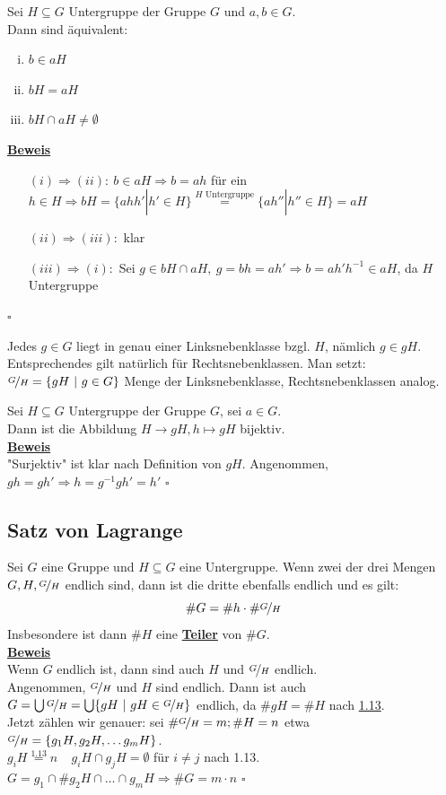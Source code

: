 \documentclass[a4paper, pagesize=pdftex, pdftex, twoside, headsepline, index=totoc,toc=listof, fontsize=10pt, cleardoublepage=empty, headinclude, DIV=13, BCOR=13mm]{scrartcl}
\newcommand{\bet}[1]{\uline{\textbf{#1}}} %
\newcommand{\Index}[1]{\uline{\textbf{#1}}\index{#1}} %
\begin{document}
Sei $H\subseteq G$ Untergruppe der Gruppe $G$ und $a,b\in G$.\\
Dann sind äquivalent:
\begin{enumerate}[(i)]
	\item $b\in aH$
	\item $bH=aH$
	\item $bH \cap aH \not= \emptyset$
\end{enumerate}
\bet{Beweis}\\
\begin{itemize}
	\item[$(i)\Rightarrow (ii):~b\in aH \Rightarrow b=ah$ für ein $h\in H \Rightarrow bH=\{ahh' | h' \in H\} \stackrel{H\text{ Untergruppe}}{=}\{ah'' | h''\in H\}=aH$]
	\item[$(ii) \Rightarrow (iii):$ klar]
	\item[$(iii) \Rightarrow (i):$ Sei $g \in bH \cap aH,~g=bh=ah' \Rightarrow b=ah'h^{-1} \in aH$, da $H$ Untergruppe]
\end{itemize}
\hfill $\square$

Jedes $g\in G$ liegt in genau einer Linksnebenklasse bzgl. $H$, nämlich $g \in gH$.
Entsprechendes gilt natürlich für Rechtsnebenklassen. Man setzt:\\
$\nicefrac{G}{H}=\{gH~|~g \in G \}$ Menge der Linksnebenklasse, Rechtsnebenklassen analog.

Sei $H\subseteq G$ Untergruppe der Gruppe $G$, sei $a \in G$.\\
Dann ist die Abbildung $H \to gH, h \mapsto gH$ bijektiv.\\
\bet{Beweis}\\
"Surjektiv" ist klar nach Definition von $gH$. Angenommen, $gh=gh' \Rightarrow h=g^{-1}gh'=h'$
\hfill $\square$

\subsection{Satz von Lagrange}
\label{sub:satz_von_lagrange}
Sei $G$ eine Gruppe und $H\subseteq G$ eine Untergruppe. Wenn zwei der drei Mengen $G,H,\nicefrac{G}{H}$ endlich sind, dann ist die dritte ebenfalls endlich und es gilt:\\
\[\#G=\#h \cdot \#\nicefrac{G}{H} \]
Insbesondere ist dann $\#H$ eine \Index{Teiler} von $\#G$.\\
\vfill
\bet{Beweis}\\
Wenn $G$ endlich ist, dann sind auch $H$ und $\nicefrac{G}{H}$ endlich.\\
Angenommen, $\nicefrac{G}{H}$ und $H$ sind endlich. Dann ist auch $G= \bigcup \nicefrac{G}{H}=\bigcup\{gH~|~gH\in \nicefrac{G}{H} \}$ endlich, da $\#gH=\#H$ nach \hyperref[sub:nebenklassen]{1.13}.\\
Jetzt zählen wir genauer: sei $\#\nicefrac{G}{H}=m; \#H=n$ etwa $\nicefrac{G}{H}=\{g_1H,g_2H,\dots g_mH \}$.\\
$g_iH\stackrel{1.13}{=}n~~~~~g_iH\cap g_jH=\emptyset$ für $i\not=j$ nach 1.13.\\
$G=g_1\cap \#g_2H\cap \dots \cap g_mH \Rightarrow \#G=m\cdot n$
\hfill $\square$
\end{document}
